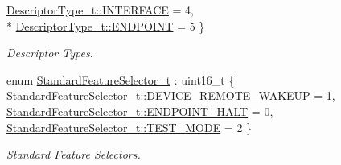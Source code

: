\begin{DoxyCompactItemize}
\hyperlink{classmdt_usb_control_transfer_a80b0f5ac6d8ae7b7e7471b012c34937da596acbde60b98295256f8e4073a8e341}{Descriptor\-Type\-\_\-t\-::\-I\-N\-T\-E\-R\-F\-A\-C\-E} = 4, 
\\*
\hyperlink{classmdt_usb_control_transfer_a80b0f5ac6d8ae7b7e7471b012c34937da2af25cfa853e622209966f152df85618}{Descriptor\-Type\-\_\-t\-::\-E\-N\-D\-P\-O\-I\-N\-T} = 5
 \}
\begin{DoxyCompactList}\small\item\em Descriptor Types. \end{DoxyCompactList}\item 
enum \hyperlink{classmdt_usb_control_transfer_acae7a9c10825dd7fa7695a16986a2f36}{Standard\-Feature\-Selector\-\_\-t} \-: uint16\-\_\-t \{ \hyperlink{classmdt_usb_control_transfer_acae7a9c10825dd7fa7695a16986a2f36aca848daa4edec831a1104579c4090324}{Standard\-Feature\-Selector\-\_\-t\-::\-D\-E\-V\-I\-C\-E\-\_\-\-R\-E\-M\-O\-T\-E\-\_\-\-W\-A\-K\-E\-U\-P} = 1, 
\hyperlink{classmdt_usb_control_transfer_acae7a9c10825dd7fa7695a16986a2f36a87146aadc04de87777e6158e4488f5aa}{Standard\-Feature\-Selector\-\_\-t\-::\-E\-N\-D\-P\-O\-I\-N\-T\-\_\-\-H\-A\-L\-T} = 0, 
\hyperlink{classmdt_usb_control_transfer_acae7a9c10825dd7fa7695a16986a2f36a149a70859728a79c49046a6f40087a4f}{Standard\-Feature\-Selector\-\_\-t\-::\-T\-E\-S\-T\-\_\-\-M\-O\-D\-E} = 2
 \}
\begin{DoxyCompactList}\small\item\em Standard Feature Selectors. \end{DoxyCompactList}\end{DoxyCompactItemize}
